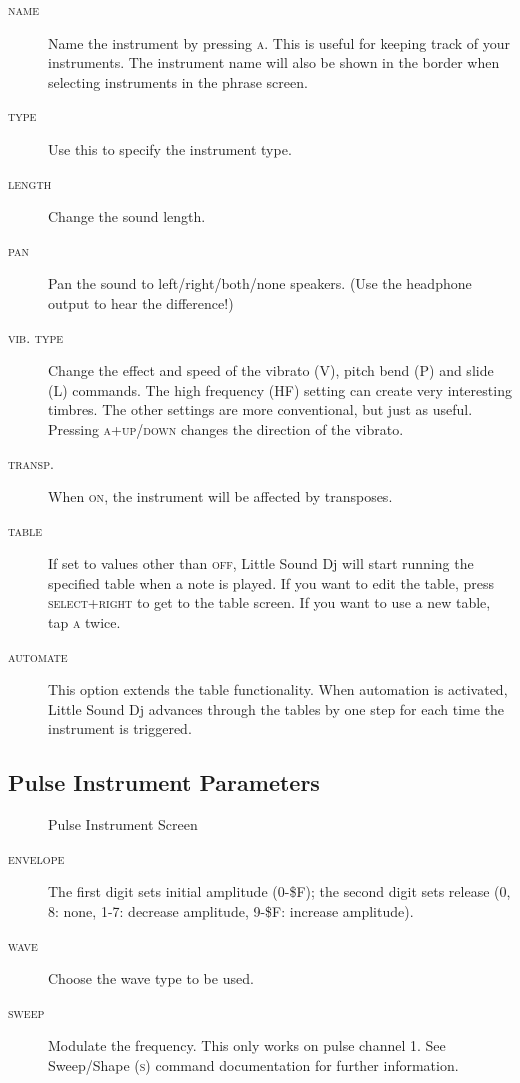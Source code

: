 \begin{description}
	\item[\textsc{name}] Name the instrument by pressing \textsc{a}. This is useful for keeping track of your instruments. The instrument name will also be shown in the border when selecting instruments in the phrase screen.
	\item[\textsc{type}] Use this to specify the instrument type.
	\item[\textsc{length}] Change the sound length.
	\item[\textsc{pan}] Pan the sound to left/right/both/none speakers. (Use the headphone output to hear the difference!)
	\item[\textsc{vib. type}] Change the effect and speed of the vibrato (V), pitch bend (P) and slide (L) commands. The high frequency (HF) setting can create very interesting timbres. The other settings are more conventional, but just as useful. Pressing \textsc{a+up/down} changes the direction of the vibrato.
    \item[\textsc{transp.}] When \textsc{on}, the instrument will be affected by transposes.
	\item[\textsc{table}] If set to values other than \textsc{off}, Little Sound Dj will start running the specified table when a note is played. If you want to edit the table, press \textsc{select+right} to get to the table screen. If you want to use a new table, tap \textsc{a} twice.
	\item[\textsc{automate}] This option extends the table functionality. When automation is activated, Little Sound Dj advances through the tables by one step for each time the instrument is triggered.
\end{description}

\subsection{Pulse Instrument Parameters}

\begin{figure}[htpb]
	\begin{center}
	\end{center}
	\caption{Pulse Instrument Screen}
	\label{fig:instr-pulse}
\end{figure}

\begin{description}
	\item[\textsc{envelope}] The first digit sets initial amplitude (0-\$F); the second digit sets release (0, 8: none, 1-7: decrease amplitude, 9-\$F: increase amplitude).
	\item[\textsc{wave}] Choose the wave type to be used.
	\item[\textsc{sweep}] Modulate the frequency. This only works on pulse channel 1. See Sweep/Shape (\textsc{s}) command documentation for further information.
\end{description}

